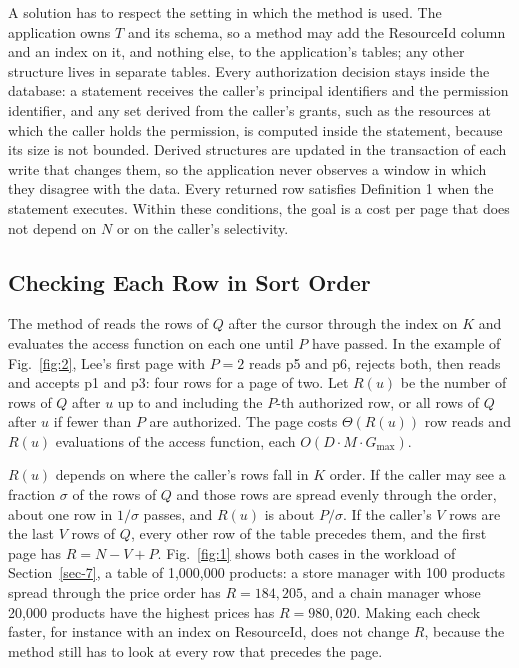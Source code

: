 \documentclass[conference]{IEEEtran}
\begin{document}
A solution has to respect the setting in which the method is used. The application owns \(T\) and its schema, so a method may add the ResourceId column and an index on it, and nothing else, to the application's tables; any other structure lives in separate tables. Every authorization decision stays inside the database: a statement receives the caller's principal identifiers and the permission identifier, and any set derived from the caller's grants, such as the resources at which the caller holds the permission, is computed inside the statement, because its size is not bounded. Derived structures are updated in the transaction of each write that changes them, so the application never observes a window in which they disagree with the data. Every returned row satisfies Definition 1 when the statement executes. Within these conditions, the goal is a cost per page that does not depend on \(N\) or on the caller's selectivity.

\subsection{Checking Each Row in Sort Order}\label{sec-3-2}

The method of \cite{ref8} reads the rows of \(Q\) after the cursor through the index on \(K\) and evaluates the access function on each one until \(P\) have passed. In the example of Fig.~\ref{fig:2}, Lee's first page with \(P = 2\) reads p5 and p6, rejects both, then reads and accepts p1 and p3: four rows for a page of two. Let \(R(u)\) be the number of rows of \(Q\) after \(u\) up to and including the \(P\)-th authorized row, or all rows of \(Q\) after \(u\) if fewer than \(P\) are authorized. The page costs \(\Theta(R(u))\) row reads and \(R(u)\) evaluations of the access function, each \(O(D \cdot M \cdot G_{\max})\).

\(R(u)\) depends on where the caller's rows fall in \(K\) order. If the caller may see a fraction \(\sigma\) of the rows of \(Q\) and those rows are spread evenly through the order, about one row in \(1/\sigma\) passes, and \(R(u)\) is about \(P/\sigma\). If the caller's \(V\) rows are the last \(V\) rows of \(Q\), every other row of the table precedes them, and the first page has \(R = N - V + P\). Fig.~\ref{fig:1} shows both cases in the workload of Section~\ref{sec-7}, a table of 1,000,000 products: a store manager with 100 products spread through the price order has \(R = 184{,}205\), and a chain manager whose 20,000 products have the highest prices has \(R = 980{,}020\). Making each check faster, for instance with an index on ResourceId, does not change \(R\), because the method still has to look at every row that precedes the page.
\end{document}
